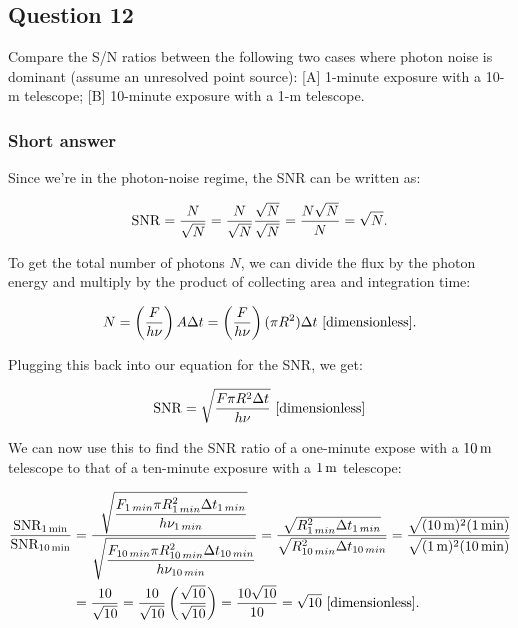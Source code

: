 \documentclass[a4paper,10pt]{article}
\begin{document}
\newpage
\subsection{Question 12}

Compare the S/N ratios between the following two cases where photon noise is dominant (assume an unresolved point source): [A] 1-minute exposure with a 10-m telescope; [B] 10-minute exposure with a 1-m telescope.

\subsubsection{Short answer}

Since we're in the photon-noise regime, the SNR can be written as:

\begin{align*}
    {\rm SNR} = \frac{N}{\sqrt{N}} = \frac{N}{\sqrt{N}} \frac{\sqrt{N}}{\sqrt{N}} = \frac{N\sqrt{N}}{N} = \sqrt{N}.
\end{align*}

{\noindent}To get the total number of photons $N$, we can divide the flux by the photon energy and multiply by the product of collecting area and integration time:

\begin{align*}
    N = \left(\frac{F}{h\nu}\right)A\Delta t = \left(\frac{F}{h\nu}\right) (\pi R^2)\Delta t ~ [{\rm dimensionless}].
\end{align*}

{\noindent}Plugging this back into our equation for the SNR, we get:

\begin{align*}
    {\rm SNR} = \sqrt{\frac{F\pi R^2\Delta t}{h\nu}} ~ [{\rm dimensionless}]
\end{align*}

{\noindent}We can now use this to find the SNR ratio of a one-minute expose with a $10\,{\rm m}$ telescope to that of a ten-minute exposure with a $1\,{\rm m}$ telescope:

\begin{align*}
    \frac{\rm SNR_{1\,min}}{\rm SNR_{10\,min}} &= \frac{\sqrt{\dfrac{F_{1\,min}\pi R_{1\,min}^2\Delta t_{1\,min}}{h\nu_{1\,min}}}}{\sqrt{\dfrac{F_{10\,min}\pi R_{10\,min}^2\Delta t_{10\,min}}{h\nu_{10\,min}}}} = \frac{\sqrt{R_{1\,min}^2\Delta t_{1\,min}}}{\sqrt{R_{10\,min}^2\Delta t_{10\,min}}} = \frac{\sqrt{(10\,{\rm m})^2(1\,{\rm min})}}{\sqrt{(1\,{\rm m})^2(10\,{\rm min})}} \\
    &= \frac{10}{\sqrt{10}} = \frac{10}{\sqrt{10}} \left(\frac{\sqrt{10}}{\sqrt{10}}\right) = \frac{10\sqrt{10}}{10} = \sqrt{10} ~ [{\rm dimensionless}].
\end{align*}
\end{document}
